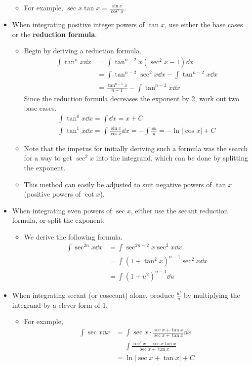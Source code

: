 \documentclass[../main.tex]{subfiles}
\begin{document}
\begin{itemize}
\begin{itemize}
        \item For example, $\sec x\tan x = \frac{\sin x}{\cos^2x}$.
    \end{itemize}
    \item When integrating positive integer powers of $\tan x$, use either the base cases or the \textbf{reduction formula}.
    \begin{itemize}
        \item Begin by deriving a reduction formula.
        \begin{align*}
            \int\tan^nx\dd{x} &= \int\tan^{n-2}x\left( \sec^2x-1 \right)\dd{x}\\
            &= \int\tan^{n-2}\sec^2x\dd{x}-\int\tan^{n-2}x\dd{x}\\
            &= \frac{\tan^{n-1}x}{n-1}-\int\tan^{n-2}x\dd{x}
        \end{align*}
        Since the reduction formula decreases the exponent by 2, work out two base cases.
        \begin{gather*}
            \int\tan^0 x\dd{x} = \int\dd{x} = x+C\\
            \int\tan^1 x\dd{x} = \int\frac{\sin x}{\cos x}\dd{x}
            = -\int\frac{\dd u}{u}
            = -\ln|\cos x|+C
        \end{gather*}
        \item Note that the impetus for initially deriving such a formula was the search for a way to get $\sec^2x$ into the integrand, which can be done by splitting the exponent.
        \item This method can easily be adjusted to suit negative powers of $\tan x$ (positive powers of $\cot x$).
    \end{itemize}
    \item When integrating even powers of $\sec x$, either use the secant reduction formula, or split the exponent.
    \begin{itemize}
        \item We derive the following formula.
        \begin{align*}
            \int\sec^{2n}x\dd{x} &= \int\sec^{2n-2}x\sec^2x\dd{x}\\
            &= \int\left( 1+\tan^2x \right)^{n-1}\sec^2x\dd{x}\\
            &= \int\left( 1+u^2 \right)^{n-1}\dd{u}
        \end{align*}
    \end{itemize}
    \item When integrating secant (or cosecant) alone, produce $\frac{u'}{u}$ by multiplying the integrand by a clever form of 1.
    \begin{itemize}
        \item For example,
        \begin{align*}
            \int\sec x\dd{x} &= \int\sec x\cdot\frac{\sec x+\tan x}{\sec x+\tan x}\dd{x}\\
            &= \int\frac{\sec^2x+\sec x\tan x}{\sec x+\tan x}\\
            &= \ln|\sec x+\tan x|+C
        \end{align*}
    \end{itemize}
\end{itemize}
\end{document}

